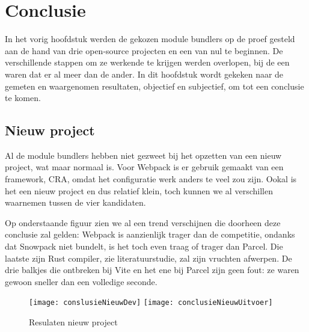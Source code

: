
\chapter{Conclusie}
\label{ch:conclusie}


In het vorig hoofdstuk werden de gekozen module bundlers op de proef gesteld aan de hand van drie open-source projecten en een van nul te beginnen. De verschillende stappen om ze werkende te krijgen werden overlopen, bij de een waren dat er al meer dan de ander. In dit hoofdstuk wordt gekeken naar de gemeten en waargenomen resultaten, objectief en subjectief, om tot een conclusie te komen.

\section{Nieuw project}

Al de module bundlers hebben niet gezweet bij het opzetten van een nieuw project, wat maar normaal is. Voor Webpack is er gebruik gemaakt van een framework, CRA, omdat het configuratie werk anders te veel zou zijn. Ookal is het een nieuw project en dus relatief klein, toch kunnen we al verschillen waarnemen tussen de vier kandidaten. 

Op onderstaande figuur zien we al een trend verschijnen die doorheen deze conclusie zal gelden: Webpack is aanzienlijk trager dan de competitie, ondanks dat Snowpack niet bundelt, is het toch even traag of trager dan Parcel. Die laatste zijn Rust compiler, zie literatuurstudie, zal zijn vruchten afwerpen. De drie balkjes die ontbreken bij Vite en het ene bij Parcel zijn geen fout: ze waren gewoon sneller dan een volledige seconde. 

\begin{figure}[h]
    \texttt{[image: conslusieNieuwDev]}
        \centering
        \texttt{[image: conclusieNieuwUitvoer]}
        \centering
        \caption{Resulaten nieuw project}
    \end{figure}


